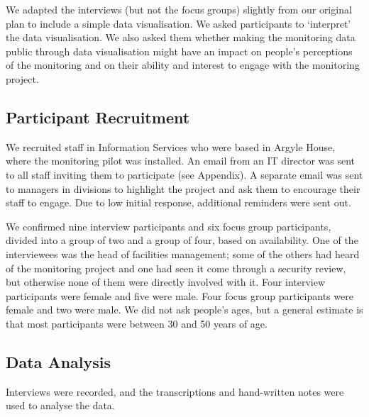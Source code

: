 We adapted the interviews (but not the focus groups) slightly from our
original plan to include a simple data visualisation. We asked
participants to `interpret’ the data visualisation. We also asked them
whether making the monitoring data public through data visualisation
might have an impact on people’s perceptions of the monitoring and on
their ability and interest to engage with the monitoring project.

\subsection{Participant Recruitment}
\label{sec:recruitment}

We recruited staff in Information Services who were based in Argyle
House, where the monitoring pilot was installed. An email from an IT
director was sent to all staff inviting them to participate (see
Appendix). A separate email was sent to managers in divisions to
highlight the project and ask them to encourage their staff to engage.
Due to low initial response, additional reminders were sent out.

We confirmed nine interview participants and six focus group participants,
divided into a group of two and a group of four, based on availability. One
of the interviewees was the head of facilities management; some of the
others had heard of the monitoring project and one had seen it come
through a security review, but otherwise none of them were directly
involved with it. Four interview participants were female and five
were male. Four focus group participants were female and two were
male. We did not ask people’s ages, but a general estimate is that
most participants were between 30 and 50 years of age.

\subsection{Data Analysis}
\label{sec:data-analysis}


Interviews were recorded, and the transcriptions and hand-written
notes were used to analyse the data. 

